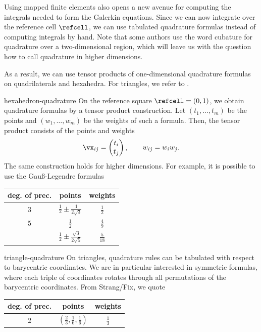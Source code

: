 \begin{remark}
  Using mapped finite elements also opens a new avenue for computing
  the integrals needed to form the Galerkin equations. Since we can
  now integrate over the reference cell $\refcell$, we can use
  tabulated quadrature formulas instead of computing integrals by
  hand. Note that some authors use the word cubature for quadrature
  over a two-dimensional region, which will leave us with the question
  how to call quadrature in higher dimensions.

  As a result, we can use tensor products of one-dimensional
  quadrature formulas on quadrilaterals and hexahedra. For triangles,
  we refer to \cite[Table 4.1]{StrangFix08}.
\end{remark}

\begin{Example}{hexahedron-quadrature}
  On the reference square $\refcell = (0,1)$, we obtain quadrature
  formulas by a tensor product construction. Let $(t_1,\dots,t_m)$ be
  the points and $(w_1,\dots,w_m)$ be the weights of such a
  formula. Then, the tensor product consists of the points and weights
  \begin{gather}
    \vx_{ij} =
    \begin{pmatrix}
      t_i\\t_j
    \end{pmatrix},
    \qquad
    w_{ij} = w_iw_j.
  \end{gather}
  The same construction holds for higher dimensions. For example, it is
  possible to use the Gauß-Legendre formulas
  \begin{center}
    \begin{tabular}{|c|c|c|}
      \hline deg. of prec. & points & weights \\\hline
      3 & $\frac12 \pm \frac1{2\sqrt3}$ & $\frac12$\\\hline
      5 & $\frac12$ & $\frac49$ \\
                          & $\frac12 \pm\frac{\sqrt3}{2\sqrt5}$
                                   &$\frac5{18}$
      \\\hline
    \end{tabular}
  \end{center}
\end{Example}

\begin{Example}{triangle-quadrature}
  On triangles, quadrature rules can be tabulated with respect to
  barycentric coordinates. We are in particular interested in
  symmetric formulas, where each triple of coordinates rotates through
  all permutations of the barycentric coordinates. From Strang/Fix, we
  quote
  \begin{center}
    \begin{tabular}{|c|c|c|}
      \hline
      deg. of prec. & points & weights \\\hline
      2 & $\left(\frac23,\frac16,\frac16\right)$ & $\frac13$
      \\\hline
    \end{tabular}
  \end{center}
\end{Example}

